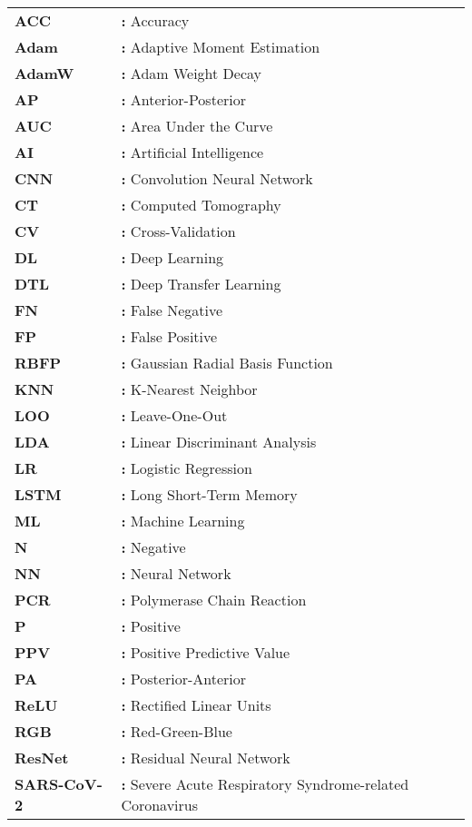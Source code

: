 \hspace{-3mm}
\begin{tabular}{p{2cm}l}
{\bf ACC}   & {\bf:} Accuracy\\
{\bf Adam}  & {\bf:} Adaptive Moment Estimation \\
{\bf AdamW} & {\bf:} Adam Weight Decay \\
{\bf AP}    & {\bf:} Anterior-Posterior  \\
{\bf AUC}   & {\bf:} Area Under the Curve\\
{\bf AI}    & {\bf:} Artificial Intelligence\\
{\bf CNN}   & {\bf:} Convolution Neural Network\\
{\bf CT}   & {\bf:}  Computed Tomography\\
{\bf CV}    & {\bf:} Cross-Validation\\
{\bf DL}    & {\bf:} Deep Learning\\
{\bf DTL}   & {\bf:} Deep Transfer Learning\\
{\bf FN}    & {\bf:} False Negative\\
{\bf FP}    & {\bf:} False Positive\\
{\bf RBFP}  & {\bf:} Gaussian Radial Basis Function\\
{\bf KNN}   & {\bf:} K-Nearest Neighbor\\
{\bf LOO}   & {\bf:} Leave-One-Out\\
{\bf LDA}   & {\bf:} Linear Discriminant Analysis\\
{\bf LR}    & {\bf:} Logistic Regression\\
{\bf LSTM}  & {\bf:} Long Short-Term Memory\\
{\bf ML}    & {\bf:} Machine Learning\\
{\bf N}     & {\bf:} Negative\\
{\bf NN}    & {\bf:} Neural Network\\
{\bf PCR}   & {\bf:} Polymerase Chain Reaction\\
{\bf P}     & {\bf:} Positive\\
{\bf PPV}   & {\bf:} Positive Predictive Value\\
{\bf PA}    & {\bf:} Posterior-Anterior \\
{\bf ReLU}  & {\bf:} Rectified Linear Units \\
{\bf RGB}  & {\bf:} Red-Green-Blue \\
{\bf ResNet} & {\bf:}  Residual Neural Network \\
{\bf SARS-CoV-2} & {\bf:} Severe Acute Respiratory Syndrome-related Coronavirus \\

\end{tabular}
